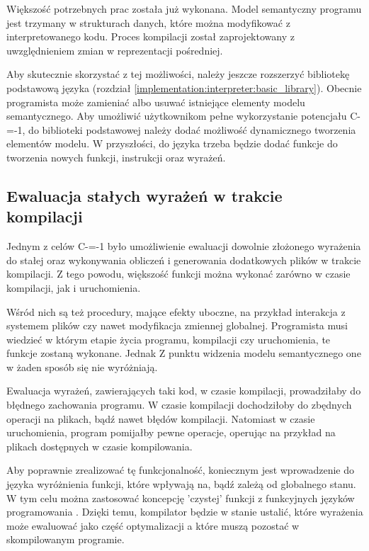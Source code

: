 Większość potrzebnych prac została już wykonana.
Model semantyczny programu jest trzymany w strukturach danych, które można modyfikować z interpretowanego kodu.
Proces kompilacji został zaprojektowany z uwzględnieniem zmian w reprezentacji pośredniej.

Aby skutecznie skorzystać z tej możliwości, należy jeszcze rozszerzyć bibliotekę podstawową języka (rozdział \ref{implementation:interpreter:basic_library}).
Obecnie programista może zamieniać albo usuwać istniejące elementy modelu semantycznego.
Aby umożliwić użytkownikom pełne wykorzystanie potencjału C-=-1, do biblioteki podstawowej należy dodać możliwość dynamicznego tworzenia elementów modelu.
W przyszłości, do języka trzeba będzie dodać funkcje do tworzenia nowych funkcji, instrukcji oraz wyrażeń.

\subsection{Ewaluacja stałych wyrażeń w trakcie kompilacji}
\label{compile_time_constant_evaluation}
Jednym z celów C-=-1 było umożliwienie ewaluacji dowolnie złożonego wyrażenia do stałej oraz wykonywania obliczeń i generowania dodatkowych plików w trakcie kompilacji.
Z tego powodu, większość funkcji można wykonać zarówno w czasie kompilacji, jak i uruchomienia.

Wśród nich są też procedury, mające efekty uboczne, na przykład interakcja z systemem plików czy nawet modyfikacja zmiennej globalnej.
Programista musi wiedzieć w którym etapie życia programu, kompilacji czy uruchomienia, te funkcje zostaną wykonane.
Jednak Z punktu widzenia modelu semantycznego one w żaden sposób się nie wyróżniają.

Ewaluacja wyrażeń, zawierających taki kod, w czasie kompilacji, prowadziłaby do błędnego zachowania programu.
W czasie kompilacji dochodziłoby do zbędnych operacji na plikach, bądź nawet błędów kompilacji.
Natomiast w czasie uruchomienia, program pomijałby pewne operacje, operując na przykład na plikach dostępnych w czasie kompilowania.

Aby poprawnie zrealizować tę funkcjonalność, koniecznym jest wprowadzenie do języka wyróżnienia funkcji, które wpływają na, bądź zależą od globalnego stanu.
W tym celu można zastosować koncepcję 'czystej' funkcji z funkcyjnych języków programowania \cite{McLoughlin1989ImperativeEF}.
Dzięki temu, kompilator będzie w stanie ustalić, które wyrażenia może ewaluować jako część optymalizacji a które muszą pozostać w skompilowanym programie.

